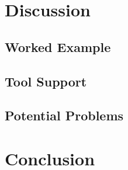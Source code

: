\documentclass[a4paper]{article}
\newcommand*{\ShowReferences}{} %
\begin{document}

\section{Discussion} %
\label{sec:discussion}

\subsection{Worked Example} %
\label{sec:workedExample}


\subsection{Tool Support} %
\label{sec:toolSupport}


\subsection{Potential Problems} %
\label{sec:potentialProblems}



\section{Conclusion} %
\label{sec:conclusion}



\ifdefined\ShowReferences
  \newpage
  
  {} %
\fi

\ifdefined\ShowGlossary
  \clearpage
  \printnoidxglossary[sort=letter]
\fi

\end{document}
